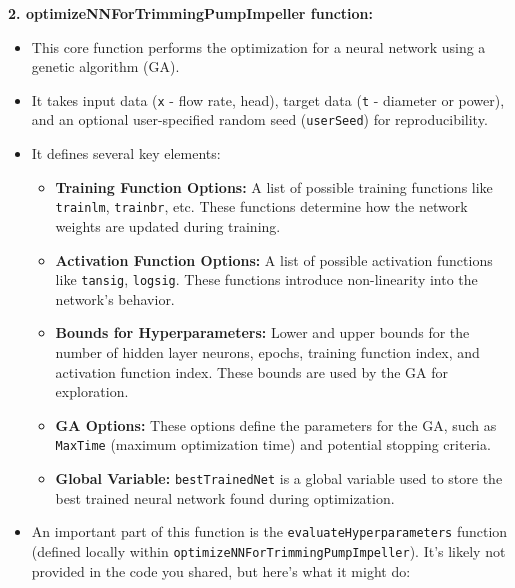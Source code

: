 \documentclass[
  super,
  review,
  3p]{elsarticle}
\providecommand{\tightlist}{%
  \setlength{\itemsep}{0pt}\setlength{\parskip}{0pt}}\usepackage{longtable,booktabs,array}
\begin{document}
\textbf{2. optimizeNNForTrimmingPumpImpeller function:}

\begin{itemize}
\tightlist
\item
  This core function performs the optimization for a neural network
  using a genetic algorithm (GA).
\item
  It takes input data (\texttt{x} - flow rate, head), target data
  (\texttt{t} - diameter or power), and an optional user-specified
  random seed (\texttt{userSeed}) for reproducibility.
\item
  It defines several key elements:

  \begin{itemize}
  \tightlist
  \item
    \textbf{Training Function Options:} A list of possible training
    functions like \texttt{\textquotesingle{}trainlm\textquotesingle{}},
    \texttt{\textquotesingle{}trainbr\textquotesingle{}}, etc. These
    functions determine how the network weights are updated during
    training.
  \item
    \textbf{Activation Function Options:} A list of possible activation
    functions like \texttt{\textquotesingle{}tansig\textquotesingle{}},
    \texttt{\textquotesingle{}logsig\textquotesingle{}}. These functions
    introduce non-linearity into the network's behavior.
  \item
    \textbf{Bounds for Hyperparameters:} Lower and upper bounds for the
    number of hidden layer neurons, epochs, training function index, and
    activation function index. These bounds are used by the GA for
    exploration.
  \item
    \textbf{GA Options:} These options define the parameters for the GA,
    such as \texttt{MaxTime} (maximum optimization time) and potential
    stopping criteria.
  \item
    \textbf{Global Variable:} \texttt{bestTrainedNet} is a global
    variable used to store the best trained neural network found during
    optimization.
  \end{itemize}
\item
  An important part of this function is the
  \texttt{evaluateHyperparameters} function (defined locally within
  \texttt{optimizeNNForTrimmingPumpImpeller}). It's likely not provided
  in the code you shared, but here's what it might do:


\end{itemize}
\end{document}
